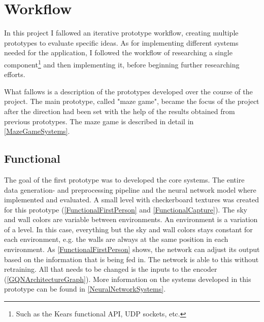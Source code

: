 
\chapter{Workflow}
In this project I fallowed an iterative prototype workflow, creating multiple prototypes to evaluate specific ideas. As for implementing different systems needed for the application, I followed the workflow of researching a single component\footnote{Such as the Kears functional API, UDP sockets, etc.} and then implementing it, before beginning further researching efforts.

What fallows is a description of the prototypes developed over the course of the project. The main prototype, called "maze game", became the focus of the project after the direction had been set with the help of the results obtained from previous prototypes. The maze game is described in detail in \cref{MazeGameSystems}.


\section{Functional}
The goal of the first prototype was to developed the core systems. The entire data generation- and preprocessing pipeline and the neural network model where implemented and evaluated. A small level with checkerboard textures was created for this prototype (\cref{FunctionalFirstPerson} and \cref{FunctionalCapture}). The sky and wall colors are variable between environments. An environment is a variation of a level. In this case, everything but the sky and wall colors stays constant for each environment, e.g. the walls are always at the same position in each environment. As \cref{FunctionalFirstPerson} shows, the network can adjust its output based on the information that is being fed in. The network is able to this without retraining. All that needs to be changed is the inputs to the encoder (\cref{GQNArchitectureGraph}). More information on the systems developed in this prototype can be found in \cref{NeuralNetworkSystems}.

